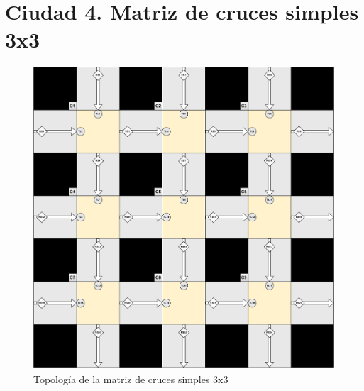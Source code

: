 \section{Ciudad 4. Matriz de cruces simples 3x3}
\begin{figure}[H]
    \centering
    \includegraphics[width=1\linewidth]{text/image/DCruc-CSimple3x3-Topologia.pdf}
    \caption{Topología de la matriz de cruces simples 3x3}
    \label{fig:cruce_simple3x3_topologia}
\end{figure}

\newpage
